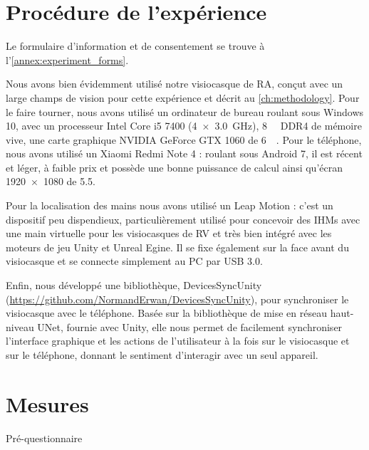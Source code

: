 \section{Procédure de l'expérience}
\label{sec:experiment_procedure}
Le formulaire d'information et de consentement se trouve à l'\autoref{annex:experiment_forms}.

Nous avons bien évidemment utilisé notre visiocasque de RA, conçut avec un large champs de vision pour cette expérience et décrit au \autoref{ch:methodology}. Pour le faire tourner, nous avons utilisé un ordinateur de bureau roulant sous Windows 10, avec un processeur Intel Core i5 7400 (\SI[product-units = single]{4x3.0}{\GHz}), \SI{8}{\giga\byte} DDR4 de mémoire vive, une carte graphique NVIDIA GeForce GTX 1060 de \SI{6}{\giga\byte}. Pour le téléphone, nous avons utilisé un Xiaomi Redmi Note 4 : roulant sous Android 7, il est récent et léger, à faible prix et possède une bonne puissance de calcul ainsi qu'écran \SI{1920x1080}{\px} de \SI{5.5}{\inch}.

Pour la localisation des mains nous avons utilisé un Leap Motion : c'est un dispositif peu dispendieux, particulièrement utilisé pour concevoir des IHMs avec une main virtuelle pour les visiocasques de RV et très bien intégré avec les moteurs de jeu Unity et Unreal Egine. Il se fixe également sur la face avant du visiocasque et se connecte simplement au PC par USB 3.0.

Enfin, nous développé une bibliothèque, DevicesSyncUnity (\url{https://github.com/NormandErwan/DevicesSyncUnity}), pour synchroniser le visiocasque avec le téléphone. Basée sur la bibliothèque de mise en réseau haut-niveau UNet, fournie avec Unity, elle nous permet de facilement synchroniser l'interface graphique et les actions de l'utilisateur à la fois sur le visiocasque et sur le téléphone, donnant le sentiment d'interagir avec un seul appareil.


\section{Mesures}
\label{sec:experiment_measures}
Pré-questionnaire

